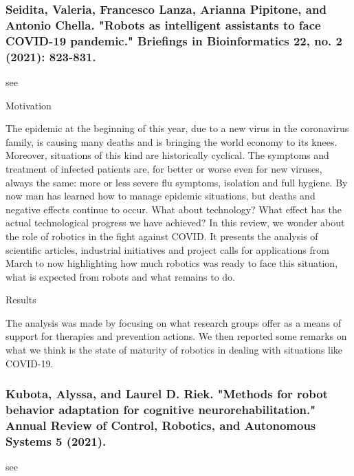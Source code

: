 \documentclass[conference]{IEEEtran}
\begin{document}
\medskip
\subsubsection{Seidita, Valeria, Francesco Lanza, Arianna Pipitone, and Antonio Chella. "Robots as intelligent assistants to face COVID-19 pandemic." Briefings in Bioinformatics 22, no. 2 (2021): 823-831.}
see \cite{seidita2021robots}

Motivation

The epidemic at the beginning of this year, due to a new virus in the coronavirus family, is causing many deaths and is bringing the world economy to its knees. Moreover, situations of this kind are historically cyclical. The symptoms and treatment of infected patients are, for better or worse even for new viruses, always the same: more or less severe flu symptoms, isolation and full hygiene. By now man has learned how to manage epidemic situations, but deaths and negative effects continue to occur. What about technology? What effect has the actual technological progress we have achieved? In this review, we wonder about the role of robotics in the fight against COVID. It presents the analysis of scientific articles, industrial initiatives and project calls for applications from March to now highlighting how much robotics was ready to face this situation, what is expected from robots and what remains to do.

Results

The analysis was made by focusing on what research groups offer as a means of support for therapies and prevention actions. We then reported some remarks on what we think is the state of maturity of robotics in dealing with situations like COVID-19.

\medskip
\subsubsection{Kubota, Alyssa, and Laurel D. Riek. "Methods for robot behavior adaptation for cognitive neurorehabilitation." Annual Review of Control, Robotics, and Autonomous Systems 5 (2021).}
see \cite{kubota2021methods}
\end{document}
